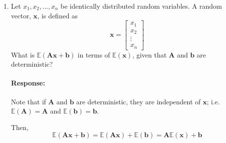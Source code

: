 \documentclass [11pt] {article}
\newcommand{\A}{\bf{A}}
\newcommand{\x}{\bf{x}}
\renewcommand{\b}{\bf{b}}
\newenvironment{response}{\begin{responseframe}\vspace{-10pt}\paragraph{Response:}}{\end{responseframe}}
\renewcommand{\bf}[1]{\textbf{{#1}}}
\begin{document}
\begin{enumerate}
\begin{enumerate}
                \newpage
            \item Let $x_1, x_2, \ldots, x_n$ be identically distributed random variables. A random
                vector, $\x$, is defined as
                \[\x = \begin{bmatrix} x_1 \\ x_2 \\ \vdots \\ x_n \end{bmatrix}\]
                What is $\mathbb{E}(\A \x + \b)$ in terms of $\mathbb{E}(\x)$, given that
                $\A$ and $\b$ are deterministic?
                \begin{response}
                    Note that if $\A$ and $\b$ are deterministic, they are independent of $\x$; i.e.
                    $\mathbb{E}(\A) = \A$ and $\mathbb{E}(\b) = \b$.

                    Then, 
                    \[\mathbb{E}(\A \x + \b) = \mathbb{E}(\A \x) + \mathbb{E}(\b) = \A \mathbb{E}(\x) + \b\]
                \end{response}


\end{enumerate}
\end{enumerate}
\end{document}
